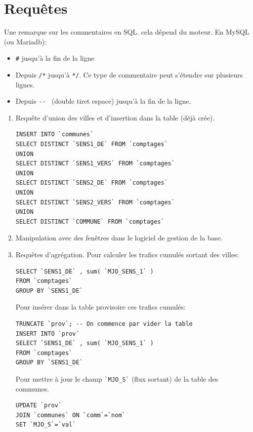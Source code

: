 \section{Requêtes}
Une remarque sur les commentaires en SQL. cela dépend du moteur. En MySQL (ou Mariadb):
\begin{itemize}
  \item \verb|#| jusqu'à la fin de la ligne
  \item Depuis \verb|/*| jusqu'à \verb|*/|. Ce type de commentaire peut s'étendre sur plusieurs lignes.
  \item Depuis \verb|-- | (double tiret espace) jusqu'à la fin de la ligne.
\end{itemize}

\begin{enumerate}
  \item Requête d'union des villes et d'insertion dans la table (déjà crée).
\begin{verbatim}
INSERT INTO `communes`
SELECT DISTINCT `SENS1_DE` FROM `comptages`
UNION
SELECT DISTINCT `SENS1_VERS` FROM `comptages`
UNION
SELECT DISTINCT `SENS2_DE` FROM `comptages`
UNION
SELECT DISTINCT `SENS2_VERS` FROM `comptages`
UNION
SELECT DISTINCT `COMMUNE` FROM `comptages`  
\end{verbatim}
\item Manipulation avec des fenêtres dans le logiciel de gestion de la base.
\item Requêtes d'agrégation. Pour calculer les trafics cumulés sortant des villes:
\begin{verbatim}
SELECT `SENS1_DE` , sum( `MJO_SENS_1` )
FROM `comptages`
GROUP BY `SENS1_DE` 
\end{verbatim}
Pour insérer dans la table provisoire ces trafics cumulés:
\begin{verbatim}
TRUNCATE `prov`; -- On commence par vider la table
INSERT INTO `prov` 
SELECT `SENS1_DE` , sum( `MJO_SENS_1` )
FROM `comptages`
GROUP BY `SENS1_DE` 
\end{verbatim}
Pour mettre à jour le champ \verb|`MJO_S`| (flux sortant) de la table des communes.
\begin{verbatim}
UPDATE `prov` 
JOIN `communes` ON `comm`=`nom`
SET `MJO_S`=`val`
\end{verbatim}


\end{enumerate}
